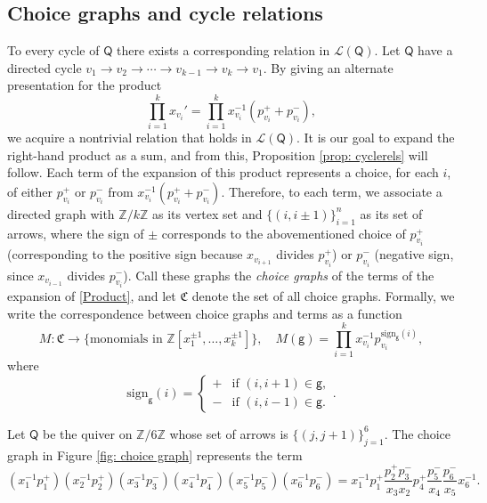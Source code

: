 \documentclass[ALCO,published]{cedram}
\numberwithin{equation}{section}
\newcommand{\Z}{\mathbb{Z}}
\renewcommand{\L}{\mathcal{L}}%
\newcommand{\1}{^{-1}}
\def\Q{\mathsf{Q}}
\begin{document}
\subsection{Choice graphs and cycle relations}
\noindent
To every cycle of $\Q$ there exists a corresponding relation in $\L(\Q)$. Let $\Q$ have a directed cycle $v_1 \to v_2 \to \cdots \to v_{k-1} \to v_k \to v_1$. By giving an alternate presentation for the product
\begin{equation}\label{Product}
\prod_{i=1}^k x_{v_i}' = \prod_{i=1}^k x_{v_i}\1 (p_{v_i}^+ + p_{v_i}^-),
\end{equation}
we acquire a nontrivial relation that holds in $\L(\Q)$. It is our goal to expand the right-hand product as a sum, and from this, Proposition \ref{prop: cyclerels} will follow.
Each term of the expansion of this product represents a choice, for each $i$, of either $p_{v_i}^+$ or $p_{v_i}^-$ from $x_{v_i}\1(p_{v_i}^+ + p_{v_i}^-)$. Therefore, to each term, we associate a directed graph with $\Z/k\Z$ as its vertex set and $\{(i,i\pm1)\}_{i=1}^n$ as its set of arrows, where the sign of $\pm$ corresponds to the abovementioned choice of $p_{v_i}^+$ (corresponding to the positive sign because $x_{v_{i+1}}$ divides $p_{v_i}^+$) or $p_{v_i}^-$ (negative sign, since $x_{v_{i-1}}$ divides $p_{v_i}^-$). Call these graphs the \textit{choice graphs} of the terms of the expansion of \eqref{Product}, and let $\mathfrak C$ denote the set of all choice graphs. Formally, we write the correspondence between choice graphs and terms as a function
\begin{equation}
M: \mathfrak C \to \{\text{monomials in }\Z[x_1^{\pm1},\dots,x_k^{\pm1}]\},\quad M(\mathsf g) = \prod_{i=1}^k x_{v_i}\1p_{v_i}^{\mathrm{sign}_{\mathsf g}(i)},
\end{equation}
where
\begin{equation}
\mathrm{sign}_{\mathsf g}(i) = \begin{cases} + & \text{if } (i,i+1) \in \mathsf g,\\ - & \text{if } (i,i-1) \in \mathsf g. \end{cases}.
\end{equation}
\begin{ex}
Let $\Q$ be the quiver on $\Z/6\Z$ whose set of arrows is $\{(j,j+1)\}_{j=1}^6$. The choice graph in Figure \ref{fig: choice graph} represents the term
\[
(x_{1}\1 p_{1}^+)(x_{2}\1 p_{2}^+)(x_{3}\1 p_{3}^-)(x_{4}\1 p_{4}^-)(x_{5}\1 p_{5}^-)(x_{6}\1 p_{6}^-) = x_{1}\1 p_{1}^+ \frac{p_{2}^+ p_{3}^-}{x_3 x_2} p_4^+ \frac{p_5^-}{x_4} \frac{p_6^-}{x_5} x_{6}\1.
\]
\end{ex}
\end{document}
